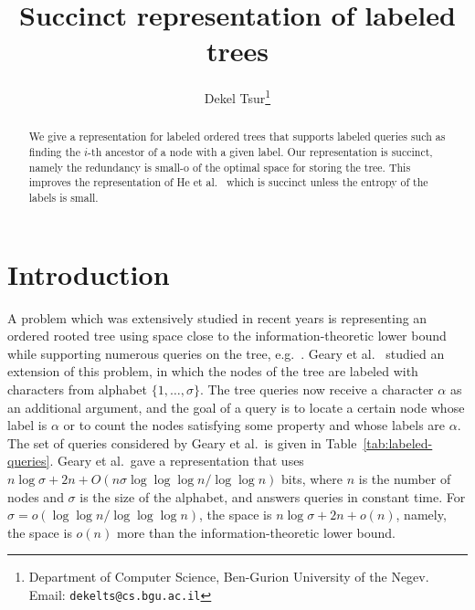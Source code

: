 \documentclass[12pt]{article}
\newcommand{\range}[2]{\{#1,\ldots,#2\}}
\begin{document}
\title{Succinct representation of labeled trees}
\author{Dekel Tsur\thanks{Department of Computer Science, Ben-Gurion University of the Negev.
Email: \texttt{dekelts@cs.bgu.ac.il}}}
\date{}
\maketitle

\begin{abstract}
We give a representation for labeled ordered trees
that supports labeled queries such as finding the $i$-th ancestor of a node
with a given label.
Our representation is succinct, namely the redundancy is
small-o of the optimal space for storing the tree.
This improves the representation of He et al.~\cite{HeMZ12} which is
succinct unless the entropy of the labels is small.
\end{abstract}

\section{Introduction}

A problem which was extensively studied in recent years is representing an ordered rooted
tree using space close to the information-theoretic lower bound
while supporting numerous queries on the tree, e.g.~\cite{Jacobson89,MunroR01,ChiangLL05,MunroRRR12,BenoitDMRRR05,GearyRR06,FarzanM08,NavarroS14}.
Geary et al.~\cite{GearyRR06} studied an extension of this problem, in which
the nodes of the tree are labeled with characters from alphabet $\range{1}{\sigma}$.
The tree queries now receive a character $\alpha$ as an additional argument, and the
goal of a query is to locate a certain node whose label is $\alpha$ or to count
the nodes satisfying some property and whose labels are $\alpha$.
The set of queries considered by Geary et al.\ is given in
Table~\ref{tab:labeled-queries}.
Geary et al.\ gave a representation that uses
$n\log\sigma+2n+O(n\sigma\log\log\log n/\log \log n)$ bits,
where $n$ is the number of nodes and $\sigma$ is the size of the alphabet,
and answers queries in constant time.
For $\sigma=o(\log\log n/\log\log\log n)$, the space is
$n\log\sigma+2n+o(n)$, namely, the space is $o(n)$ more than the
information-theoretic lower bound.
\end{document}
